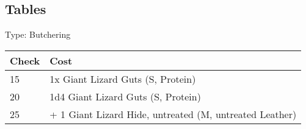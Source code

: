 \subsection{Tables}
Type: Butchering
\\
\begin{minipage}{0.8\textwidth}
    \begin{tabular}{|l | l|}
        \hline
        Check & Cost\\
        \hline
        15 & 1x Giant Lizard Guts (S, Protein)\\
        20 & 1d4 Giant Lizard Guts (S, Protein)\\
        25 & + 1 Giant Lizard Hide, untreated (M, untreated Leather)\\
        \hline
    \end{tabular}
\end{minipage}
\pagebreak